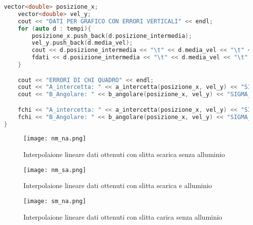 \documentclass[a4paper,11pt,oneside]{article}
\begin{document}
\begin{lstlisting}[language=C++, label=lst:seconda_analisi.cxx, caption=seconda\_analisi.cxx]
    vector<double> posizione_x;
    vector<double> vel_y;
    cout << "DATI PER GRAFICO CON ERRORI VERTICALI" << endl;
    for (auto d : tempi){
        posizione_x.push_back(d.posizione_intermedia);
        vel_y.push_back(d.media_vel);
        cout << d.posizione_intermedia << "\t" << d.media_vel << "\t" << d.dstd_vel << endl;
        fdati << d.posizione_intermedia << "\t" << d.media_vel << "\t" << d.dstd_vel << endl;
    }

    cout << "ERRORI DI CHI QUADRO" << endl;
    cout << "A_intercetta: " << a_intercetta(posizione_x, vel_y) << "SIGMA_A: " << sigma_a(posizione_x, vel_y) << endl;
    cout << "B_Angolare: " << b_angolare(posizione_x, vel_y) << "SIGMA_B: " << sigma_b(posizione_x, vel_y) << endl;

    fchi << "A_intercetta: " << a_intercetta(posizione_x, vel_y) << "SIGMA_A: " << sigma_a(posizione_x, vel_y) << endl;
    fchi << "B_Angolare: " << b_angolare(posizione_x, vel_y) << "SIGMA_B: " << sigma_b(posizione_x, vel_y) << endl;
}
\end{lstlisting}









\begin{figure}[h]
    \caption{Interpolaione lineare dati ottenuti con slitta scarica senza alluminio}
    \label{fig:nm_na.png}
    \centering
           \texttt{[image: nm\_na.png]}
\end{figure}
\begin{figure}[h]
    \caption{Interpolaione lineare dati ottenuti con slitta scarica e alluminio}
    \label{fig:nm_sa.png}
    \centering
           \texttt{[image: nm\_sa.png]}
\end{figure}
\begin{figure}[h]
    \caption{Interpolaione lineare dati ottenuti con slitta carica senza alluminio}
    \label{fig:sm_na.png}
    \centering
           \texttt{[image: sm\_na.png]}
\end{figure}
\end{document}
